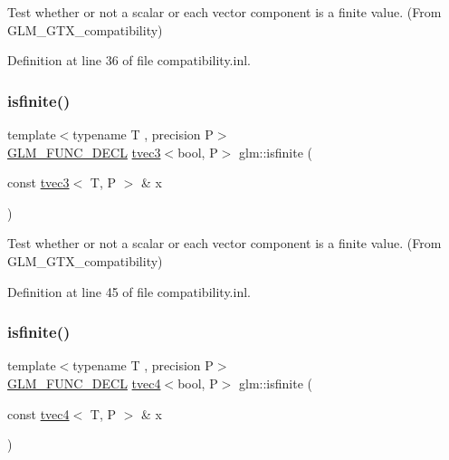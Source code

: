 Test whether or not a scalar or each vector component is a finite value. (From G\+L\+M\+\_\+\+G\+T\+X\+\_\+compatibility) 



Definition at line 36 of file compatibility.\+inl.

\mbox{\label{group__gtx__compatibility_ga1be9593d810fceb278a2854da8a25273}} 
\subsubsection{\texorpdfstring{isfinite()}{isfinite()}\hspace{0.1cm}{\footnotesize\ttfamily [4/5]}}
{\footnotesize\ttfamily template$<$typename T , precision P$>$ \\
\mbox{\hyperlink{setup_8hpp_ab2d052de21a70539923e9bcbf6e83a51}{G\+L\+M\+\_\+\+F\+U\+N\+C\+\_\+\+D\+E\+CL}} \mbox{\hyperlink{structglm_1_1tvec3}{tvec3}}$<$bool, P$>$ glm\+::isfinite (\begin{DoxyParamCaption}\item[{const \mbox{\hyperlink{structglm_1_1tvec3}{tvec3}}$<$ T, P $>$ \&}]{x }\end{DoxyParamCaption})}



Test whether or not a scalar or each vector component is a finite value. (From G\+L\+M\+\_\+\+G\+T\+X\+\_\+compatibility) 



Definition at line 45 of file compatibility.\+inl.

\mbox{\label{group__gtx__compatibility_ga8c6a59e2f2ac84fba0c5932f1c35bf7a}} 
\subsubsection{\texorpdfstring{isfinite()}{isfinite()}\hspace{0.1cm}{\footnotesize\ttfamily [5/5]}}
{\footnotesize\ttfamily template$<$typename T , precision P$>$ \\
\mbox{\hyperlink{setup_8hpp_ab2d052de21a70539923e9bcbf6e83a51}{G\+L\+M\+\_\+\+F\+U\+N\+C\+\_\+\+D\+E\+CL}} \mbox{\hyperlink{structglm_1_1tvec4}{tvec4}}$<$bool, P$>$ glm\+::isfinite (\begin{DoxyParamCaption}\item[{const \mbox{\hyperlink{structglm_1_1tvec4}{tvec4}}$<$ T, P $>$ \&}]{x }\end{DoxyParamCaption})}



